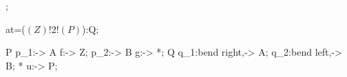 \startcommutativediagram

;

\obj at=($(Z)!2!(P)$):Q;

\mor[swap] P p_1:-> A f:-> Z;
\mor       * p_2:-> B g:-> *;
\mor[swap] Q q_1:{bend right},-> A;
\mor       * q_2:{bend left},-> B;
 * u:-> P;

\stopcommutativediagram
